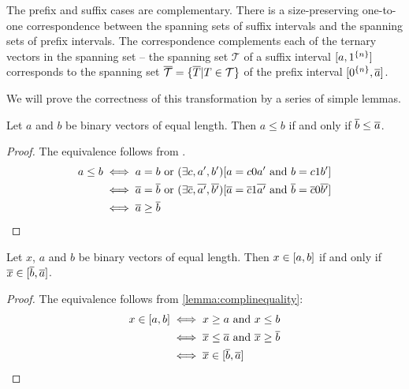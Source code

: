 
The prefix and suffix cases are complementary.
There is a size-preserving
one-to-one
correspondence between
the spanning sets of suffix intervals
and the spanning sets
of prefix intervals.
The correspondence complements each of the ternary vectors in the spanning set
-- the spanning set $\mathcal{T}$
of a suffix interval $[a, 1^{\{n\}}]$
corresponds to the spanning set
$\overline{\mathcal{T}}
= \{\overline{T} | T \in \mathcal{T}\}$
of the prefix interval
$[0^{\{n\}}, \overline{a}]$.

We will prove the correctness of this transformation
by a series of simple lemmas.

\begin{lemma}
\label{lemma:complinequality}
Let $a$ and $b$ be binary vectors of equal length.
Then $a \leq b$ if and only if $\overline{b} \leq \overline{a}$.
\end{lemma}

\begin{proof}
The equivalence follows from .
\begin{align*}
a \leq b &\iff a=b \text{ or } (\exists c, a', b') [a=c0a' \text{ and } b=c1b'] \\
&\iff \overline{a}=\overline{b} \text{ or } (\exists \overline{c}, \overline{a'}, \overline{b'}) [\overline{a}=\overline{c}1\overline{a'} \text{ and } \overline{b}=\overline{c}0\overline{b'}] \\
&\iff \overline{a} \geq \overline{b}
\end{align*}
\end{proof}

\begin{lemma}
\label{lemma:complinterval}
Let $x$, $a$ and $b$ be binary vectors of equal length.
Then $x \in [a, b]$ if and only if $\overline{x} \in [\overline{b}, \overline{a}]$.
\end{lemma}

\begin{proof}
The equivalence follows from \cref{lemma:complinequality}:
\begin{align*}
x \in [a, b] &\iff x \geq a \text{ and } x \leq b \\
&\iff \overline{x} \leq \overline{a} \text{ and } \overline{x} \geq \overline{b} \\
&\iff \overline{x} \in [\overline{b}, \overline{a}]
\end{align*}
\end{proof}

